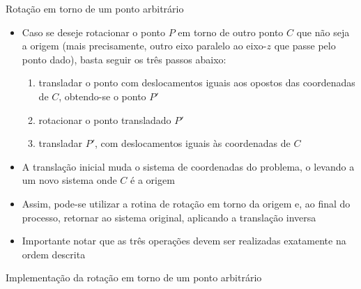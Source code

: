 \begin{frame}[fragile]{Rotação em torno de um ponto arbitrário}

    \begin{itemize}
        \item Caso se deseje rotacionar o ponto $P$ em torno de outro ponto $C$ que não seja a 
            origem (mais precisamente, outro eixo paralelo ao eixo-$z$ que passe pelo ponto 
            dado), basta seguir os três passos abaixo:

        \begin{enumerate}
            \item transladar o ponto com deslocamentos iguais aos opostos das coordenadas de $C$, 
                obtendo-se o ponto $P'$
            \item rotacionar o ponto transladado $P'$
            \item transladar $P'$, com deslocamentos iguais às coordenadas de $C$
        \end{enumerate}

        \item A translação inicial muda o sistema de coordenadas do problema, o levando a um novo 
            sistema onde $C$ é a origem

        \item Assim, pode-se utilizar a rotina de rotação em torno da origem e, ao final do processo, retornar ao sistema original, aplicando a translação inversa

        \item Importante notar que as três operações devem ser realizadas exatamente na ordem descrita
    \end{itemize}

\end{frame}

\begin{frame}[fragile]{Implementação da rotação em torno de um ponto arbitrário}
\end{frame}


